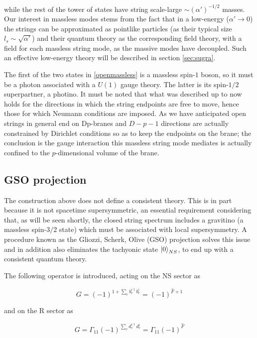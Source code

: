 while the rest of the tower of states have string scale-large $\sim (\alpha')^{-1/2}$ masses. Our interest in massless modes stems from the fact that in a low-energy ($\alpha' \rightarrow 0$) the strings can be approximated as pointlike particles (as their typical size $l_s \sim \sqrt{\alpha'}$) and their quantum theory as the corresponding field theory, with a field for each massless string mode, as the massive modes have decoupled. Such an effective low-energy theory will be described in section \ref{sec:sugra}.



The first of the two states in \eqref{openmassless} is a massless spin-$1$ boson, so it must be a photon associated with a $U(1)$ gauge theory. The latter is its spin-$1/2$ superpartner, a photino. It must be noted that what was described up to now holds for the directions in which the string endpoints are free to move, hence those for which Neumann conditions are imposed. As we have anticipated open strings in general end on Dp-branes and $D-p-1$ directions are actually constrained by Dirichlet conditions so as to keep the endpoints on the brane; the conclusion is the gauge interaction this massless string mode mediates is actually confined to the $p$-dimensional volume of the brane.

\subsection{GSO projection}

The construction above does not define a consistent theory. This is in part because it is not spacetime supersymmetric, an essential requirement considering that, as will be seen shortly, the closed string spectrum includes a gravitino (a massless spin-$3/2$ state) which must be associated with local supersymmetry. A procedure known as the Gliozzi, Scherk, Olive (GSO) projection solves this issue and in addition also eliminates the tachyonic state $\ket{0}_{NS}$, to end up with a consistent quantum theory.

The following operator is introduced, acting on the NS sector as

\begin{equation}
	G = (-1)^{1+\sum_r b_r^{i\dagger} b_r^i} = (-1)^{\hat F + 1}
	\label{}
\end{equation}

and on the R sector as

\begin{equation}
	G = \Gamma_{11}(-1)^{\sum_r d_r^{i\dagger} d_r^i} = \Gamma_{11} (-1)^{\hat F}
	\label{}
\end{equation}

